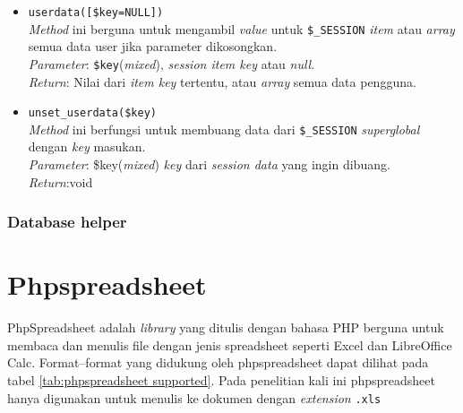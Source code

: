 \begin{itemize}
	\item \texttt{userdata([\$key=NULL])} \\
	\textit{Method} ini berguna untuk mengambil \textit{value} untuk \texttt{\$\_SESSION} \textit{item} atau \textit{array} semua data user jika parameter dikosongkan. \\
	\textit{Parameter}: \texttt{\$key}(\textit{mixed}), \textit{session item key} atau \textit{null}. \\
	\textit{Return}: Nilai dari \textit{item key} tertentu, atau \textit{array} semua data pengguna.
	
	\item \texttt{unset\_userdata(\$key)} \\
	\textit{Method} ini berfungsi untuk membuang data dari \texttt{\$\_SESSION} \textit{superglobal} dengan \textit{key} masukan. \\ 
	\textit{Parameter}: \$key(\textit{mixed}) \textit{key} dari \textit{session data} yang ingin dibuang. \\
	\textit{Return}:void 
	
\end{itemize}
\subsubsection{Database helper}

\section{Phpspreadsheet}
\label{section:phpspreadsheet}

PhpSpreadsheet adalah \textit{library} yang ditulis dengan bahasa PHP berguna untuk membaca dan menulis file dengan jenis spreadsheet seperti Excel dan LibreOffice Calc\cite{phpspreadsheet}. Format--format yang didukung oleh phpspreadsheet dapat dilihat pada tabel \ref{tab:phpspreadsheet supported}. Pada penelitian kali ini phpspreadsheet hanya digunakan untuk menulis ke dokumen dengan \textit{extension} \texttt{.xls}

